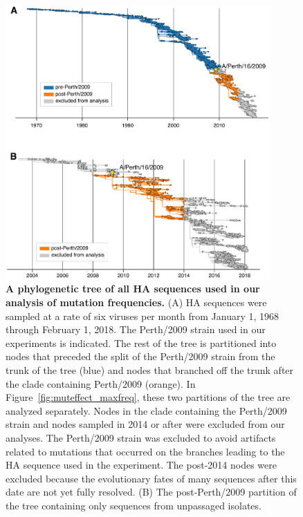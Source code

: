 \documentclass[9pt,twoside,lineno]{pnas-new}
\begin{document}
\begin{figure}
\centerline{\includegraphics[width=0.9\textwidth]{figs/supp_H3N2_phylogeny/H3N2_phylogeny.pdf}}
\caption{\label{suppfig:tree}
{\bf A phylogenetic tree of all HA sequences used in our analysis of mutation frequencies.}
(A) HA sequences were sampled at a rate of six viruses per month from January 1, 1968 through February 1, 2018.
The Perth/2009 strain used in our experiments is indicated.
The rest of the tree is partitioned into nodes that preceded the split of the Perth/2009 strain from the trunk of the tree (blue) and nodes that branched off the trunk after the clade containing Perth/2009 (orange).
In Figure~\ref{fig:muteffect_maxfreq}, these two partitions of the tree are analyzed separately.
Nodes in the clade containing the Perth/2009 strain and nodes sampled in 2014 or after were excluded from our analyses.
The Perth/2009 strain was excluded to avoid artifacts related to mutations that occurred on the branches leading to the HA sequence used in the experiment.
The post-2014 nodes were excluded because the evolutionary fates of many sequences after this date are not yet fully resolved.
(B) The post-Perth/2009 partition of the tree containing only sequences from unpassaged isolates.
}
\end{figure}
\FloatBarrier
\end{document}

